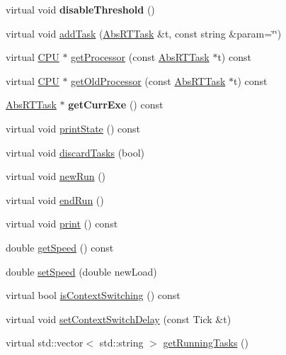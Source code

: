 \begin{DoxyCompactItemize}
\item 
virtual void {\bfseries disable\+Threshold} ()\hypertarget{classRTSim_1_1RTKernel_a61aad046c8b171b3e4038ffd03edb677}{}\label{classRTSim_1_1RTKernel_a61aad046c8b171b3e4038ffd03edb677}

\item 
virtual void \hyperlink{classRTSim_1_1RTKernel_a884cabc7ad53a0c2cee69d68b9bb7cba}{add\+Task} (\hyperlink{classRTSim_1_1AbsRTTask}{Abs\+R\+T\+Task} \&t, const string \&param=\char`\"{}\char`\"{})
\item 
virtual \hyperlink{classRTSim_1_1CPU}{C\+PU} $\ast$ \hyperlink{classRTSim_1_1RTKernel_a243501a194428985a2b0b26848e06f9a}{get\+Processor} (const \hyperlink{classRTSim_1_1AbsRTTask}{Abs\+R\+T\+Task} $\ast$t) const 
\item 
virtual \hyperlink{classRTSim_1_1CPU}{C\+PU} $\ast$ \hyperlink{classRTSim_1_1RTKernel_aeb28ef73743303f89bf6c8faa20aae17}{get\+Old\+Processor} (const \hyperlink{classRTSim_1_1AbsRTTask}{Abs\+R\+T\+Task} $\ast$t) const 
\item 
\hyperlink{classRTSim_1_1AbsRTTask}{Abs\+R\+T\+Task} $\ast$ {\bfseries get\+Curr\+Exe} () const \hypertarget{classRTSim_1_1RTKernel_a954411b60db7a3672966e30814dd7e77}{}\label{classRTSim_1_1RTKernel_a954411b60db7a3672966e30814dd7e77}

\item 
virtual void \hyperlink{classRTSim_1_1RTKernel_aa569e1eae8cf795b31c13ca6f08dd141}{print\+State} () const 
\item 
virtual void \hyperlink{classRTSim_1_1RTKernel_a6f461987f92abd46fe7b60d2ffe357b6}{discard\+Tasks} (bool)
\item 
virtual void \hyperlink{classRTSim_1_1RTKernel_add9fb52593157121107b225ed25e13a1}{new\+Run} ()
\item 
virtual void \hyperlink{classRTSim_1_1RTKernel_a2bc0b04bbb785f54e4ae60440bbcd816}{end\+Run} ()
\item 
virtual void \hyperlink{classRTSim_1_1RTKernel_a2f7c6287046804748fc6c385f53b5227}{print} () const 
\item 
double \hyperlink{classRTSim_1_1RTKernel_a2f21033e802331a25e2072c3de420406}{get\+Speed} () const 
\item 
double \hyperlink{classRTSim_1_1RTKernel_a19595afa9a8e1da3cf8f631487fa6d4a}{set\+Speed} (double new\+Load)
\item 
virtual bool \hyperlink{classRTSim_1_1RTKernel_a7f9afeb2b707eff616671f92b4f7f690}{is\+Context\+Switching} () const 
\item 
virtual void \hyperlink{classRTSim_1_1RTKernel_aa022825e71c6da8662270e8ba50c4163}{set\+Context\+Switch\+Delay} (const Tick \&t)
\item 
virtual std\+::vector$<$ std\+::string $>$ \hyperlink{classRTSim_1_1RTKernel_a3120222bdc8beb0f9c81763791332caf}{get\+Running\+Tasks} ()
\end{DoxyCompactItemize}
